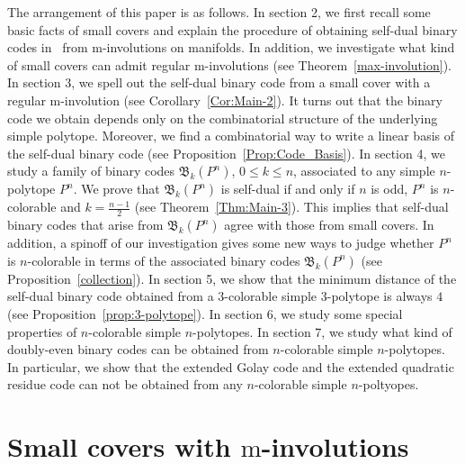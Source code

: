 \documentclass[12pt]{amsart}
\theoremstyle{plain} \numberwithin{equation}{section}
\theoremstyle{definition}
\theoremstyle{remark}
\begin{document}
  
  The arrangement of this paper is as follows. In section 2, we first recall some basic facts of
  small covers and explain the procedure of obtaining self-dual binary codes in~\cite{p}
   from 
  $\mathrm{m}$-involutions on manifolds. In addition, we  
  investigate what kind of small covers can admit regular $\mathrm{m}$-involutions 
  (see Theorem~\ref{max-involution}). In section 3, we 
  spell out the self-dual binary code from a small cover with a regular 
  $\mathrm{m}$-involution (see Corollary~\ref{Cor:Main-2}).
  It turns out that the binary code we obtain depends only on the combinatorial structure of the 
  underlying simple polytope. Moreover, we find a combinatorial way to
   write a linear basis of the self-dual binary code (see Proposition~\ref{Prop:Code_Basis}).
   In section 4, we 
 study a family of binary codes $\mathfrak{B}_k(P^n)$, 
 $0\leq k \leq n$, associated to any simple $n$-polytope $P^n$. We 
 prove that $\mathfrak{B}_k(P^n)$ is self-dual if and only if $n$ is odd,
 $P^n$ is
 $n$-colorable and $k=\frac{n-1}{2}$ (see Theorem~\ref{Thm:Main-3}). This implies that
  self-dual binary codes that arise from $\mathfrak{B}_k(P^n)$ agree with those
  from small covers.
 In addition, a spinoff of our investigation gives some
  new ways to judge whether $P^n$ is $n$-colorable in terms of 
  the associated binary codes $\mathfrak{B}_k(P^n)$ (see Proposition~\ref{collection}).
  In section 5, we show that the minimum distance of the
   self-dual binary code obtained from a $3$-colorable simple $3$-polytope is always
    $4$ (see Proposition~\ref{prop:3-polytope}).
  In section 6, we study some special properties of 
   $n$-colorable simple $n$-polytopes. In section 7, we study what kind of 
  doubly-even binary codes can be obtained from $n$-colorable simple $n$-polytopes. 
  In particular, we show
  that the extended Golay code and 
  the extended quadratic residue code can not be obtained from 
   any $n$-colorable simple $n$-poltyopes.\\

  \section{Small covers with $\mathrm{m}$-involutions}
\end{document}
